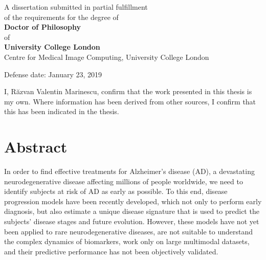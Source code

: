 \documentclass[12pt,a4paper,twoside]{book}
\begin{document}
\begin{titlepage}
\begin{center}
{\vfill
 
A dissertation submitted in partial fulfillment \\
of the requirements for the degree of\\[0.3cm]
\textbf{Doctor of Philosophy}\\[0.3cm]
of\\[0.3cm]
\textbf{University College London}\\[1cm]

Centre for Medical Image Computing, University College London
 
 \vfill
% 
% 

{\Large Defense date: January 23, 2019} %

}
\end{center}
\end{titlepage}


\clearpage


I, R\u{a}zvan Valentin Marinescu, confirm that the work presented in this thesis is my own. Where information has been derived from other sources, I confirm that this has been indicated in the thesis.

\clearpage


\chapter*{Abstract}

In order to find effective treatments for Alzheimer's disease (AD), a devastating neurodegenerative disease affecting millions of people worldwide, we need to identify subjects at risk of AD as early as possible. To this end, disease progression models have been recently developed, which not only to perform early diagnosis, but also estimate a unique disease signature that is used to predict the subjects' disease stages and future evolution. However, these models have not yet been applied to rare neurodegenerative diseases, are not suitable to understand the complex dynamics of biomarkers, work only on large multimodal datasets, and their predictive performance has not been objectively validated.
\end{document}
